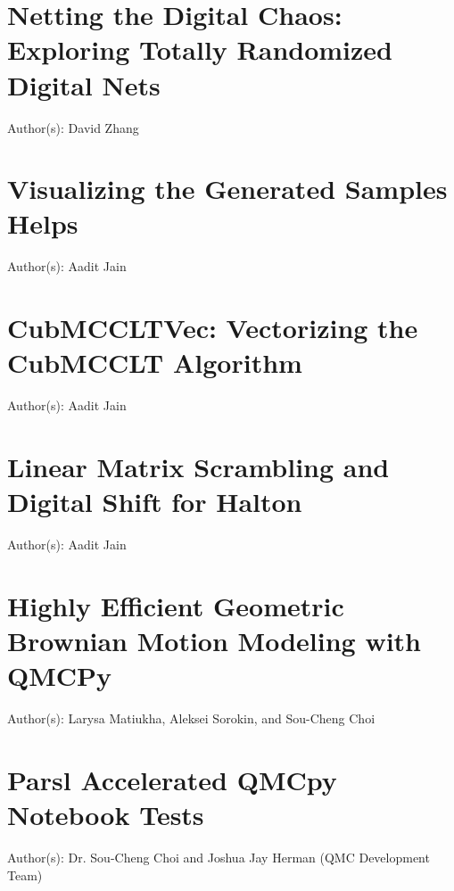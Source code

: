 \documentclass{article}
\newcommand{\blogpost}[5][{}]{\newpage%
\section{#2 {\color{teal}#1}}%
\begin{refsection}%
    \label{#4}%
	Author(s): #3 \newline \newline%
\printbibliography[heading=subbibliography]
\end{refsection}
} %
\theoremstyle{definition}
\begin{document}

 \blogpost{Netting the Digital Chaos: Exploring Totally Randomized Digital Nets}{David Zhang}{}{TotallyRandomDnet/totallyrandomdnet}










\blogpost{Visualizing the Generated Samples Helps}{Aadit Jain}{plotproj}{PlotProjectionsFunction/plotprojectionsfunction}

\blogpost{CubMCCLTVec: Vectorizing the CubMCCLT Algorithm}{Aadit Jain}{cubmccltvec}{CubMCCLTVec/cubmccltvec}

\blogpost{Linear Matrix Scrambling and Digital Shift for Halton}{Aadit Jain}{lms_ds_halton}{LMS_DS_Halton/lms_ds_halton}

\blogpost{Highly Efficient Geometric Brownian Motion Modeling with QMCPy}{Larysa Matiukha, Aleksei Sorokin, and Sou-Cheng Choi}{gbm}{GBM/gbm}

\blogpost{Parsl Accelerated QMCpy Notebook Tests}{Dr. Sou-Cheng Choi and Joshua Jay Herman (QMC Development Team)}{parslTestbookQMCblog}{booktests/parslTestbookQMCblog}
\end{document}
